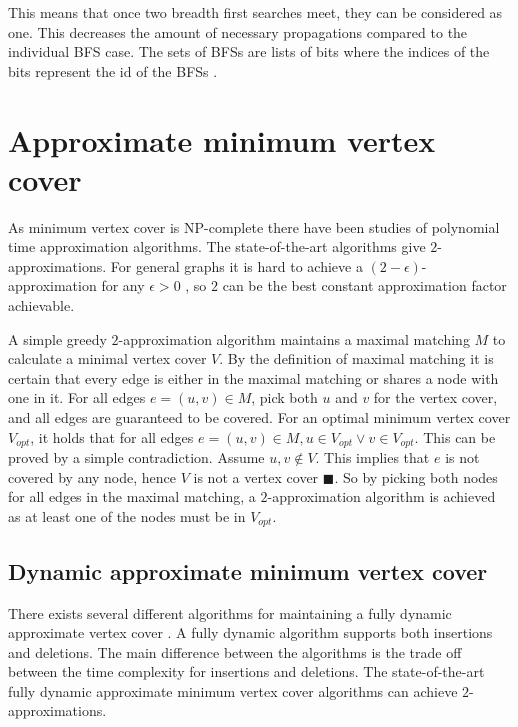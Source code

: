 This means that once two breadth first searches meet, they can be considered as one. This decreases the amount of necessary propagations compared to the individual BFS case. The sets of BFSs are lists of bits where the indices of the bits represent the id of the BFSs \cite{msbfs}.

\section{Approximate minimum vertex cover}
As minimum vertex cover is NP-complete there have been studies of polynomial time approximation algorithms. The state-of-the-art algorithms give $2$-approximations. For general graphs it is hard to achieve a $(2-\epsilon)$-approximation for any $\epsilon > 0$ \cite{2-evchard}, so $2$ can be the best constant approximation factor achievable.

A simple greedy $2$-approximation algorithm maintains a maximal matching $M$ to calculate a minimal vertex cover $V$. By the definition of maximal matching it is certain that every edge is either in the maximal matching or shares a node with one in it. For all edges $e = (u,v) \in M$, pick both $u$ and $v$ for the vertex cover, and all edges are guaranteed to be covered. For an optimal minimum vertex cover $V_{opt}$, it holds that for all edges $e = (u,v) \in M, u \in V_{opt} \vee v \in V_{opt}$. This can be proved by a simple contradiction. Assume $u,v \notin V$. This implies that $e$ is not covered by any node, hence $V$ is not a vertex cover $\blacksquare$. So by picking both nodes for all edges in the maximal matching, a $2$-approximation algorithm is achieved as at least one of the nodes must be in $V_{opt}$.

\subsection{Dynamic approximate minimum vertex cover}
There exists several different algorithms for maintaining a fully dynamic approximate vertex cover \cite{2appdynvc, 2appdynvclogn, 2eappdynvc}. A fully dynamic algorithm supports both insertions and deletions. The main difference between the algorithms is the trade off between the time complexity for insertions and deletions. The state-of-the-art fully dynamic approximate minimum vertex cover algorithms can achieve $2$-approximations.




